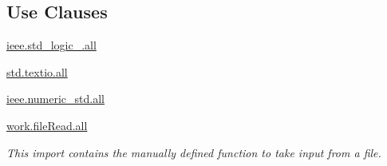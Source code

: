 \subsection*{Use Clauses}
 \begin{DoxyCompactItemize}
\item 
\hypertarget{class_i_f_unit_a43ecb358105806229eb7a3074fc4d577}{\hyperlink{class_i_f_unit_a43ecb358105806229eb7a3074fc4d577}{ieee.\-std\-\_\-logic\-\_.\-all}   }\label{class_i_f_unit_a43ecb358105806229eb7a3074fc4d577}

\item 
\hypertarget{class_i_f_unit_a7a235ce84abb82b20481281563b754a4}{\hyperlink{class_i_f_unit_a7a235ce84abb82b20481281563b754a4}{std.\-textio.\-all}   }\label{class_i_f_unit_a7a235ce84abb82b20481281563b754a4}

\item 
\hypertarget{class_i_f_unit_a631689596594b2068e0ee8dadd0931fe}{\hyperlink{class_i_f_unit_a631689596594b2068e0ee8dadd0931fe}{ieee.\-numeric\-\_\-std.\-all}   }\label{class_i_f_unit_a631689596594b2068e0ee8dadd0931fe}

\item 
\hypertarget{class_i_f_unit_a04d6b3861e96938512d3dcf21757e289}{\hyperlink{class_i_f_unit_a04d6b3861e96938512d3dcf21757e289}{work.\-file\-Read.\-all}   }\label{class_i_f_unit_a04d6b3861e96938512d3dcf21757e289}

\begin{DoxyCompactList}\small\item\em This import contains the manually defined function to take input from a file. \end{DoxyCompactList}\end{DoxyCompactItemize}
